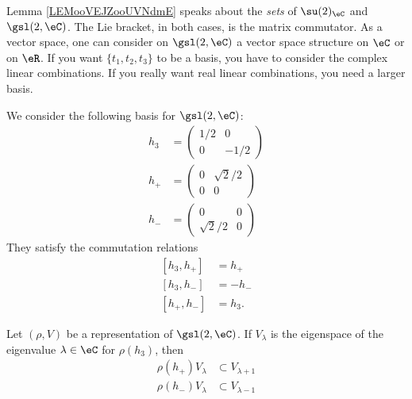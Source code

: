 \begin{normaltext}
    Lemma \ref{LEMooVEJZooUVNdmE} speaks about the \emph{sets} of \( \su(2)_{\eC}\) and \( \gsl(2,\eC)\). The Lie bracket, in both cases, is the matrix commutator. As a vector space, one can consider on \( \gsl(2,\eC)\) a vector space structure on \( \eC\) or on \( \eR\). If you want \( \{ t_1, t_2, t_3 \}\) to be a basis, you have to consider the complex linear combinations. If you really want real linear combinations, you need a larger basis.
\end{normaltext}

We consider the following basis for \( \gsl(2,\eC)\):
\begin{subequations}        \label{EQSooORIBooAsgdDp}
    \begin{align}
        h_3&=\begin{pmatrix}
            1/2    &   0    \\ 
            0    &   -1/2    
        \end{pmatrix}\\
        h_+&=\begin{pmatrix}
            0    &   \sqrt{ 2 }/2    \\ 
            0    &   0    
        \end{pmatrix}\\
        h_-&=\begin{pmatrix}
            0    &   0    \\ 
            \sqrt{ 2 }/2    &   0    
        \end{pmatrix}
    \end{align}
\end{subequations}
They satisfy the commutation relations
\begin{subequations}        \label{SUBEQSooXMMVooKtnRXW}
    \begin{align}
        [h_3,h_+]&=h_+\\
        [h_3,h_-]&=-h_-\\
        [h_+,h_-]&=h_3.
    \end{align}
\end{subequations}

\begin{lemma}     \label{LEMooDGUYooPUkDNr}
    Let \( (\rho, V)\) be a representation of \( \gsl(2,\eC)\). If \( V_{\lambda}\) is the eigenspace of the eigenvalue \( \lambda\in \eC\) for \( \rho(h_3)\), then
    \begin{subequations}
        \begin{align}
            \rho(h_+)V_{\lambda}&\subset V_{\lambda+1}\\
            \rho(h_-)V_{\lambda}&\subset V_{\lambda-1}
        \end{align}
    \end{subequations}
\end{lemma}

